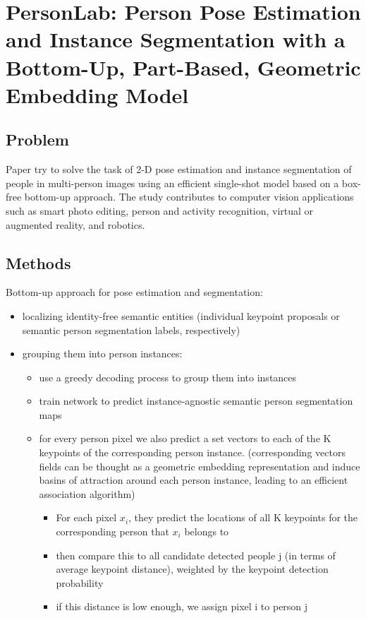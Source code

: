 \section{PersonLab: Person Pose Estimation and Instance Segmentation with a Bottom-Up, Part-Based, Geometric Embedding Model
\cite{DBLP:journals/corr/abs-1803-08225}}

\subsection{Problem}
\par Paper try to solve the task of 2-D pose estimation and instance segmentation of people in multi-person images using an efficient single-shot model based on a box-free bottom-up approach. 
The study contributes to computer vision applications such as smart photo editing, person and activity recognition, virtual or augmented reality, and robotics. 

\subsection{Methods}
 Bottom-up approach for pose estimation and segmentation:
 \begin{itemize}
 \item localizing identity-free semantic entities (individual keypoint proposals or semantic person segmentation labels, respectively)
    \item grouping them into person instances:
    \begin{itemize}
        \item use a greedy decoding process to group them into instances
        \item train network to predict instance-agnostic semantic person segmentation maps
        \item for every person pixel we also predict a set vectors to each of the K keypoints of the corresponding person instance. (corresponding vectors fields can be thought as a geometric embedding representation and induce basins of attraction around each person instance, leading to an efficient association algorithm)
         \begin{itemize}
         \item For each pixel $x_i$, they predict the locations of all K keypoints for the corresponding person that $x_i$ belongs to
         \item then compare this to all candidate detected people j (in terms of average keypoint distance), weighted by the keypoint detection probability 
         \item if this distance is low enough, we assign pixel i to person j

         \end{itemize}
    \end{itemize}
 \end{itemize}



